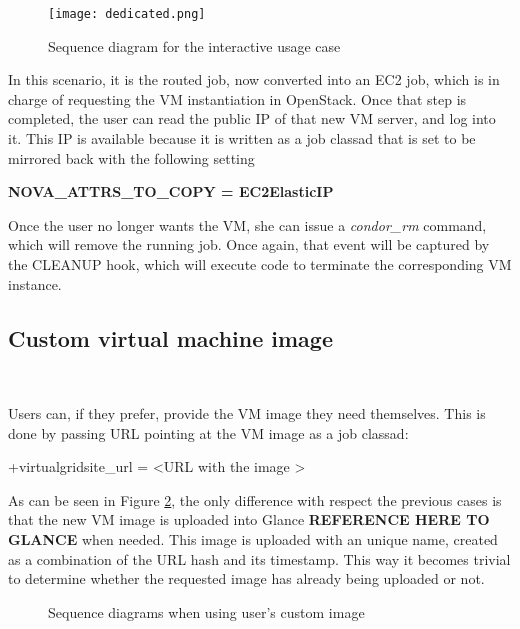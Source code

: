 \documentclass[a4paper]{jpconf}
\begin{document}
\begin{figure}[h]
    \centering
    \texttt{[image: dedicated.png]}
    \caption{Sequence diagram for the interactive usage case}
    \label{fig:interactive}
\end{figure}

In this scenario, it is the routed job, now converted into an EC2 job, 
which is in charge of requesting the VM instantiation in OpenStack.
Once that step is completed, the user can read the public IP of that new VM server, and log into it. 
This IP is available because it is written as a job classad that is set to be
mirrored back with the following setting

\begin{center}
    \colorbox{htcondorbox}{
        \begin{minipage}{\textwidth}
        \small
            \bf{NOVA\_ATTRS\_TO\_COPY = EC2ElasticIP
            }
        \end{minipage}
    }
\end{center}

Once the user no longer wants the VM, she can issue a \textit{condor\_rm}
command, which will remove the running job. 
Once again, that event will be captured by the CLEANUP hook, which will execute
code to terminate the corresponding VM instance.


\subsection{Custom virtual machine image}

~

Users can, if they prefer, provide the VM image they need themselves. 
This is done by passing URL pointing at the VM image as a job classad:
\begin{center}
    +virtualgridsite\_url = \textless URL with the image \textgreater
\end{center}

As can be seen in Figure \ref{fig:custom}, 
the only difference with respect the previous cases is that the new VM image is uploaded into Glance \textbf{REFERENCE HERE TO GLANCE} when needed.
This image is uploaded with an unique name, 
created as a combination of the URL hash and its timestamp. 
This way it becomes trivial to determine whether the requested image has already being uploaded or not. 

\begin{figure}[h]
    \centering
    \qquad
    \caption{Sequence diagrams when using user's custom image}%
    \label{fig:custom}%
\end{figure}
\end{document}

